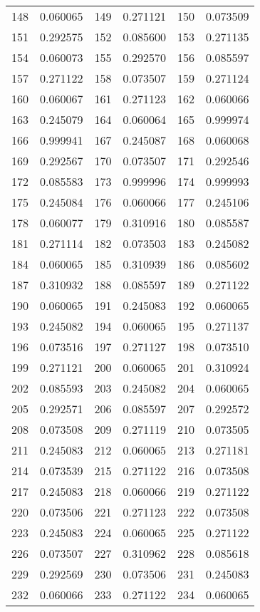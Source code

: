 \documentclass[12pt]{article}
\begin{document}
\begin{longtable}{@{}cc|cc|cc@{}}
148 & 0.060065 & 149 & 0.271121 & 150 & 0.073509 \\
151 & 0.292575 & 152 & 0.085600 & 153 & 0.271135 \\
154 & 0.060073 & 155 & 0.292570 & 156 & 0.085597 \\
157 & 0.271122 & 158 & 0.073507 & 159 & 0.271124 \\
160 & 0.060067 & 161 & 0.271123 & 162 & 0.060066 \\
163 & 0.245079 & 164 & 0.060064 & 165 & 0.999974 \\
166 & 0.999941 & 167 & 0.245087 & 168 & 0.060068 \\
169 & 0.292567 & 170 & 0.073507 & 171 & 0.292546 \\
172 & 0.085583 & 173 & 0.999996 & 174 & 0.999993 \\
175 & 0.245084 & 176 & 0.060066 & 177 & 0.245106 \\
178 & 0.060077 & 179 & 0.310916 & 180 & 0.085587 \\
181 & 0.271114 & 182 & 0.073503 & 183 & 0.245082 \\
184 & 0.060065 & 185 & 0.310939 & 186 & 0.085602 \\
187 & 0.310932 & 188 & 0.085597 & 189 & 0.271122 \\
190 & 0.060065 & 191 & 0.245083 & 192 & 0.060065 \\
193 & 0.245082 & 194 & 0.060065 & 195 & 0.271137 \\
196 & 0.073516 & 197 & 0.271127 & 198 & 0.073510 \\
199 & 0.271121 & 200 & 0.060065 & 201 & 0.310924 \\
202 & 0.085593 & 203 & 0.245082 & 204 & 0.060065 \\
205 & 0.292571 & 206 & 0.085597 & 207 & 0.292572 \\
208 & 0.073508 & 209 & 0.271119 & 210 & 0.073505 \\
211 & 0.245083 & 212 & 0.060065 & 213 & 0.271181 \\
214 & 0.073539 & 215 & 0.271122 & 216 & 0.073508 \\
217 & 0.245083 & 218 & 0.060066 & 219 & 0.271122 \\
220 & 0.073506 & 221 & 0.271123 & 222 & 0.073508 \\
223 & 0.245083 & 224 & 0.060065 & 225 & 0.271122 \\
226 & 0.073507 & 227 & 0.310962 & 228 & 0.085618 \\
229 & 0.292569 & 230 & 0.073506 & 231 & 0.245083 \\
232 & 0.060066 & 233 & 0.271122 & 234 & 0.060065 \\

\end{longtable}
\end{document}
